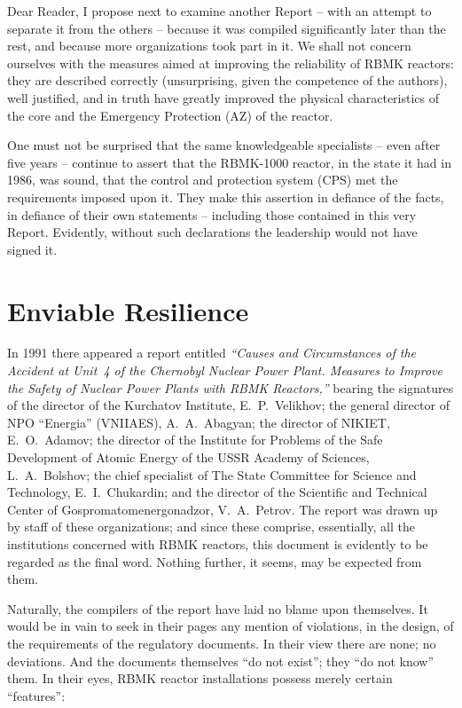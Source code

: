 \documentclass[openright]{bookest}
\begin{document}
Dear Reader, I propose next to examine another Report -- with an attempt to separate it from the others -- because it was compiled significantly later than the rest, and because more organizations took part in it. We shall not concern ourselves with the measures aimed at improving the reliability of RBMK reactors: they are described correctly (unsurprising, given the competence of the authors), well justified, and in truth have greatly improved the physical characteristics of the core and the Emergency Protection (AZ) of the reactor.

One must not be surprised that the same knowledgeable specialists -- even after five years -- continue to assert that the RBMK-1000 reactor, in the state it had in 1986, was sound, that the control and protection system (CPS) met the requirements imposed upon it. They make this assertion in defiance of the facts, in defiance of their own statements -- including those contained in this very Report. Evidently, without such declarations the leadership would not have signed it.

\chapter{Enviable Resilience}


In 1991 there appeared a report entitled \textit{``Causes and Circumstances of the Accident at Unit~4 of the Chernobyl Nuclear Power Plant. Measures to Improve the Safety of Nuclear Power Plants with RBMK Reactors,''} bearing the signatures of the director of the Kurchatov Institute, E.~P.~Velikhov; the general director of NPO ``Energia'' (VNIIAES), A.~A.~Abagyan; the director of NIKIET, E.~O.~Adamov; the director of the Institute for Problems of the Safe Development of Atomic Energy of the USSR Academy of Sciences, L.~A.~Bolshov; the chief specialist of The State Committee for Science and Technology, E.~I.~Chukardin; and the director of the Scientific and Technical Center of Gospromatomenergonadzor, V.~A.~Petrov. The report was drawn up by staff of these organizations; and since these comprise, essentially, all the institutions concerned with RBMK reactors, this document is evidently to be regarded as the final word. Nothing further, it seems, may be expected from them.

Naturally, the compilers of the report have laid no blame upon themselves. It would be in vain to seek in their pages any mention of violations, in the design, of the requirements of the regulatory documents. In their view there are none; no deviations. And the documents themselves ``do not exist''; they ``do not know'' them. In their eyes, RBMK reactor installations possess merely certain ``features'':
\end{document}
